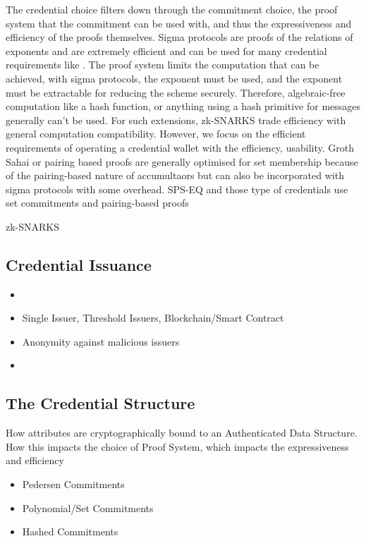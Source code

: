 The credential choice filters down through the commitment choice, the proof system that the commitment can be used with, and thus the expressiveness and efficiency of the proofs themselves. 
Sigma protocols are proofs of the relations of exponents and are extremely efficient and can be used for many credential requirements like . The proof system limits the computation that can be achieved, with sigma protocols, the exponent must be used, and the exponent must be extractable for reducing the scheme securely. Therefore, algebraic-free computation like a hash function, or anything using a hash primitive for messages generally can't be used. For such extensions, zk-SNARKS trade efficiency with general computation compatibility. However, we focus on the efficient requirements of operating a credential wallet with the efficiency, usability. 
Groth Sahai or pairing based proofs are generally optimised for set membership because of the pairing-based nature of accumultaors but can also be incorporated with sigma protocols with some overhead. SPS-EQ and those type of credentials use set commitments and pairing-based proofs 

zk-SNARKS 




\subsection{Credential Issuance}
\begin{itemize}
    \item 
    \item Single Issuer, Threshold Issuers, Blockchain/Smart Contract
    \item Anonymity against malicious issuers
    \item 
\end{itemize}


\subsection{The Credential Structure}
How attributes are cryptographically bound to an Authenticated Data Structure.
How this impacts the choice of Proof System, which impacts the expressiveness and efficiency
\begin{itemize}
    \item Pedersen Commitments
    \item Polynomial/Set Commitments
    \item Hashed Commitments 
\end{itemize}


